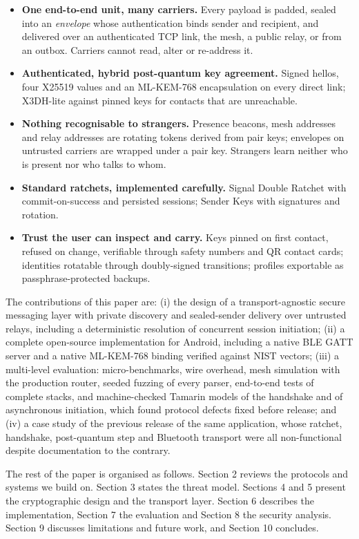 \documentclass[conference]{IEEEtran}
\begin{document}
\begin{itemize}
  \item \textbf{One end-to-end unit, many carriers.} Every payload is padded, sealed into an \emph{envelope} whose authentication binds sender and recipient, and delivered over an authenticated TCP link, the mesh, a public relay, or from an outbox. Carriers cannot read, alter or re-address it.
  \item \textbf{Authenticated, hybrid post-quantum key agreement.} Signed hellos, four X25519 values and an ML-KEM-768 encapsulation on every direct link; X3DH-lite against pinned keys for contacts that are unreachable.
  \item \textbf{Nothing recognisable to strangers.} Presence beacons, mesh addresses and relay addresses are rotating tokens derived from pair keys; envelopes on untrusted carriers are wrapped under a pair key. Strangers learn neither who is present nor who talks to whom.
  \item \textbf{Standard ratchets, implemented carefully.} Signal Double Ratchet with commit-on-success and persisted sessions; Sender Keys with signatures and rotation.
  \item \textbf{Trust the user can inspect and carry.} Keys pinned on first contact, refused on change, verifiable through safety numbers and QR contact cards; identities rotatable through doubly-signed transitions; profiles exportable as passphrase-protected backups.
\end{itemize}
The contributions of this paper are: (i) the design of a transport-agnostic secure messaging layer with private discovery and sealed-sender delivery over untrusted relays, including a deterministic resolution of concurrent session initiation; (ii) a complete open-source implementation for Android, including a native BLE GATT server and a native ML-KEM-768 binding verified against NIST vectors; (iii) a multi-level evaluation: micro-benchmarks, wire overhead, mesh simulation with the production router, seeded fuzzing of every parser, end-to-end tests of complete stacks, and machine-checked Tamarin models of the handshake and of asynchronous initiation, which found protocol defects fixed before release; and (iv) a case study of the previous release of the same application, whose ratchet, handshake, post-quantum step and Bluetooth transport were all non-functional despite documentation to the contrary.

The rest of the paper is organised as follows. Section 2 reviews the protocols and systems we build on. Section 3 states the threat model. Sections 4 and 5 present the cryptographic design and the transport layer. Section 6 describes the implementation, Section 7 the evaluation and Section 8 the security analysis. Section 9 discusses limitations and future work, and Section 10 concludes.
\end{document}
